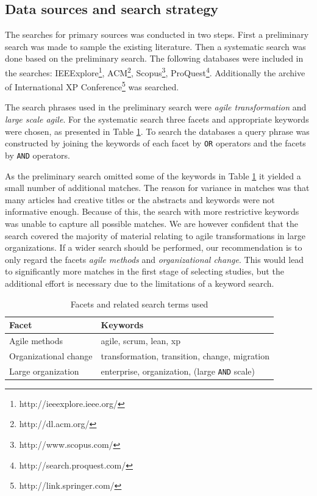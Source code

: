 \documentclass[lnbip]{svmultln}
\begin{document}
\subsection{Data sources and search strategy}

The searches for primary sources was conducted in two steps. First a preliminary
search was made to sample the existing literature. Then a systematic search was
done based on the preliminary search. The following databases were included in
the searches: IEEExplore\footnote{http://ieeexplore.ieee.org/},
ACM\footnote{http://dl.acm.org/}, Scopus\footnote{http://www.scopus.com/},
ProQuest\footnote{http://search.proquest.com/}.
Additionally the archive of International XP
Conference\footnote{http://link.springer.com/} was searched.

The search phrases used in the preliminary search were \textit{agile
transformation} and \textit{large scale agile}. For the systematic search three
facets and appropriate keywords were chosen, as presented in Table
\ref{table:searchterms}. To search the databases a query phrase was constructed
by joining the keywords of each facet by \texttt{OR} operators and the facets by
\texttt{AND} operators.

As the preliminary search omitted some of the keywords in Table
\ref{table:searchterms} it yielded a small number of additional matches. The
reason for variance in matches was that many articles had creative titles or the
abstracts and keywords were not informative enough. Because of this, the search
with more restrictive keywords was unable to capture all possible matches.
We are however confident that the search covered the majority of material
relating to agile transformations in large organizations. If a wider search
should be performed, our recommendation is to only regard the facets
\textit{agile methods} and \textit{organizational change}. This would lead to
significantly more matches in the first stage of selecting studies, but the
additional effort is necessary due to the limitations of a keyword search.

\begin{table}[h]
    \centering
    \begin{tabular}{ p{4cm} l }
        \toprule
        Facet                  & Keywords   \\ \midrule
        Agile methods          & agile, scrum, lean, xp \\ 
        Organizational change  & transformation, transition, change, migration \\
        Large organization     & enterprise, organization, (large \texttt{AND} scale) \\
        \bottomrule
    \end{tabular}
    \caption{Facets and related search terms used}
    \label{table:searchterms}
\end{table}
\end{document}
